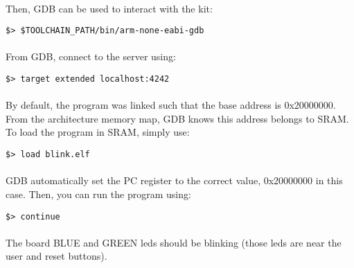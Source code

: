 \documentclass[a4paper, 11pt]{article}
\begin{document}
\paragraph{}
Then, GDB can be used to interact with the kit:\\
\begin{small}
\begin{lstlisting}[frame=tb]
$> $TOOLCHAIN_PATH/bin/arm-none-eabi-gdb
\end{lstlisting}
\end{small}

\paragraph{}
From GDB, connect to the server using:\\
\begin{small}
\begin{lstlisting}[frame=tb]
$> target extended localhost:4242
\end{lstlisting}
\end{small}

\paragraph{}
By default, the program was linked such that the base address is 0x20000000. From the architecture
memory map, GDB knows this address belongs to SRAM. To load the program in SRAM, simply use:\\
\begin{small}
\begin{lstlisting}[frame=tb]
$> load blink.elf
\end{lstlisting}
\end{small}

\paragraph{}
GDB automatically set the PC register to the correct value, 0x20000000 in this case. Then, you
can run the program using:\\
\begin{small}
\begin{lstlisting}[frame=tb]
$> continue
\end{lstlisting}
\end{small}

\paragraph{}
The board BLUE and GREEN leds should be blinking (those leds are near the user and reset buttons).
\end{document}
